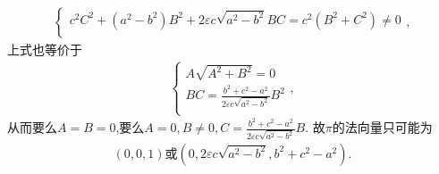 \documentclass[../../main.tex]{subfiles}%
\begin{document}
\begin{solution}
\begin{align*}
\begin{cases}
c^2C^2+\left( a^2-b^2 \right) B^2+2\varepsilon c\sqrt{a^2-b^2}BC=c^2\left( B^2+C^2 \right) \ne 0\\
\end{cases},
\end{align*}
上式也等价于
\begin{align*}
\begin{cases}
A\sqrt{A^2+B^2}=0\\
BC=\frac{b^2+c^2-a^2}{2\varepsilon c\sqrt{a^2-b^2}}B^2\\
\end{cases},
\end{align*}
从而要么$A=B=0$,要么$A=0,B\ne 0,C=\frac{b^2+c^2-a^2}{2\varepsilon c\sqrt{a^2-b^2}}B.$
故$\pi$的法向量只可能为
\begin{align*}
(0,0,1)\text{或}(0,2\varepsilon c\sqrt{a^2-b^2},b^2+c^2-a^2).
\end{align*}

\end{solution}
\end{document}
